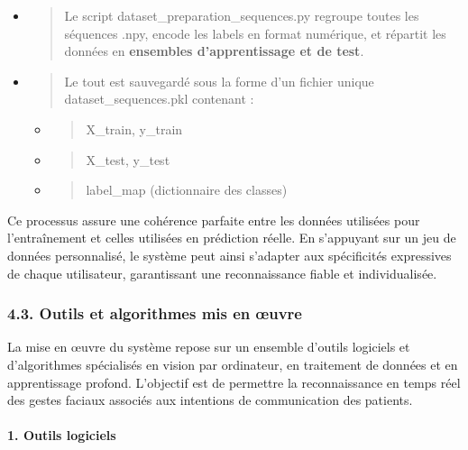 \documentclass[
]{article}
\begin{document}
\begin{itemize}
\item
  \begin{quote}
  Le script dataset\_preparation\_sequences.py regroupe toutes les séquences .npy, encode les labels en format numérique, et répartit les données en \textbf{ensembles d'apprentissage et de test}.
  \end{quote}
\item
  \begin{quote}
  Le tout est sauvegardé sous la forme d'un fichier unique dataset\_sequences.pkl contenant :
  \end{quote}

  \begin{itemize}
  \item
    \begin{quote}
    X\_train, y\_train
    \end{quote}
  \item
    \begin{quote}
    X\_test, y\_test
    \end{quote}
  \item
    \begin{quote}
    label\_map (dictionnaire des classes)
    \end{quote}
  \end{itemize}
\end{itemize}

Ce processus assure une cohérence parfaite entre les données utilisées pour l'entraînement et celles utilisées en prédiction réelle. En s'appuyant sur un jeu de données personnalisé, le système peut ainsi s'adapter aux spécificités expressives de chaque utilisateur, garantissant une reconnaissance fiable et individualisée.

\hypertarget{outils-et-algorithmes-mis-en-ux153uvre}{%
\subsubsection{4.3. Outils et algorithmes mis en œuvre}\label{outils-et-algorithmes-mis-en-ux153uvre}}

La mise en œuvre du système repose sur un ensemble d'outils logiciels et d'algorithmes spécialisés en vision par ordinateur, en traitement de données et en apprentissage profond. L'objectif est de permettre la reconnaissance en temps réel des gestes faciaux associés aux intentions de communication des patients.

\hypertarget{outils-logiciels}{%
\paragraph{\texorpdfstring{\textbf{1. Outils logiciels}}{1. Outils logiciels}}\label{outils-logiciels}}
\end{document}
